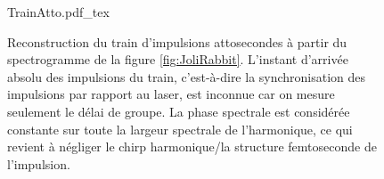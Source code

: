 \begin{figure}
\centering
\def\svgwidth{0.5\columnwidth}
{TrainAtto.pdf_tex}
\caption{Reconstruction du train d'impulsions attosecondes à partir du spectrogramme de la figure \ref{fig:JoliRabbit}. L'instant d'arrivée absolu des impulsions du train, c'est-à-dire la synchronisation des impulsions par rapport au laser, est inconnue car on mesure seulement le délai de groupe. La phase spectrale est considérée constante sur toute la largeur spectrale de l'harmonique, ce qui revient à négliger le chirp harmonique/la structure femtoseconde de l'impulsion.}
\label{fig:TrainAtto}
\end{figure}